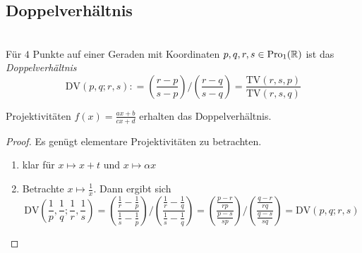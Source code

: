 \subsection*{Doppelverhältnis}
  \begin{defi}[Doppelverhältnis] \ \\
    Für $4$ Punkte auf einer Geraden mit Koordinaten $p,q,r,s\in \operatorname{Pro}_1(\mathbb R)$ ist das \textit{Doppelverhältnis}
    \begin{equation*}
      \text{DV}(p,q;r,s) : = \left(\frac{r-p}{s-p}\right) \Big/ \left(\frac{r-q}{s-q}\right) = \frac{\text{TV}(r,s,p)}{\text{TV}(r,s,q)}
    \end{equation*}
  \end{defi}
  
  \begin{thm}
    Projektivitäten $\displaystyle{f(x)=\frac{ax+b}{cx+d}}$ erhalten das Doppelverhältnis.
  \end{thm}
  \begin{proof}
    Es genügt elementare Projektivitäten zu betrachten.\par
    \begin{enumerate}[(1)]
      \item klar für $x\mapsto x+t$ und $x\mapsto \alpha x$
      \item Betrachte $x\mapsto \frac{1}{x}$. Dann ergibt sich
            \begin{equation*}
                \text{DV}\left( \frac{1}{p}, \frac{1}{q}; \frac{1}{r}, \frac{1}{s} \right)
                  = \left( \frac{ \frac{1}{r}-\frac{1}{p} }{ \frac{1}{s}-\frac{1}{p} }\right)\Big/\left(\frac{ \frac{1}{r}-\frac{1}{q} }{ \frac{1}{s}-\frac{1}{q}}\right) 
                  = \left( \frac{ \frac{p-r}{rp} }{ \frac{p-s}{sp} } \right) \Big/ \left( \frac{ \frac{q-r}{rq} }{ \frac{q-s}{sq} } \right) 
                  = \text{DV}(p,q;r,s)
            \end{equation*}
    \end{enumerate}
  \end{proof}
  
